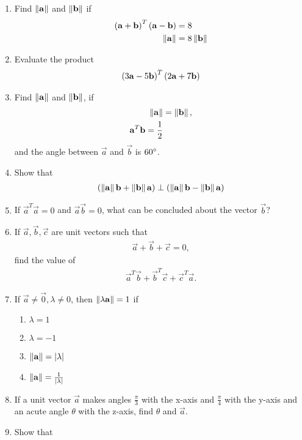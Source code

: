 \documentclass[journal,12pt,twocolumn]{IEEEtran}
\renewcommand\thesection{\arabic{section}}
\begin{document}
\begin{enumerate}[label=\thesection.\arabic*.,ref=\thesection.\theenumi]
\item Find $\left\lVert\mathbf{a}\right\rVert$ and $\left\lVert\mathbf{b}\right\rVert$ if 
\begin{align}
\left(\mathbf{a}+\mathbf{b}\right)^T\left(\mathbf{a}-\mathbf{b}\right) &= 8
\\
\left\lVert\mathbf{a}\right\rVert&=8\left\lVert\mathbf{b}\right\rVert
\end{align}
\item Evaluate the product 
\begin{align}
\left(3\mathbf{a}-5\mathbf{b}\right)^T\left(2\mathbf{a}+7\mathbf{b}\right) 
\end{align}
\item Find $\left\lVert\mathbf{a}\right\rVert$ and $\left\lVert\mathbf{b}\right\rVert$, if
\begin{align}
\left\lVert\mathbf{a}\right\rVert &= \left\lVert\mathbf{b}\right\rVert,
\\
\mathbf{a}^T\mathbf{b} = \frac{1}{2} 
\end{align}
and the angle between $\vec{a}$ and $\vec{b}$ is $60\degree$.
\item Show that 
\begin{align}
\left(\left\lVert\mathbf{a}\right\rVert\mathbf{b}+\left\lVert\mathbf{b}\right\rVert\mathbf{a}\right)\perp \left(\left\lVert\mathbf{a}\right\rVert\mathbf{b}-\left\lVert\mathbf{b}\right\rVert\mathbf{a}\right)\\
\end{align}
\item If $\vec{a}^T\vec{a}=0$ and  $\vec{a}\vec{b}=0$, what can be concluded about the vector $\vec{b}$?
\item If $\vec{a},\vec{b},\vec{c}$ are unit vectors such that 
\begin{align}
\vec{a}+\vec{b}+\vec{c} = 0,
\end{align}
find the value of 
\begin{align}
\vec{a}^T\vec{b}+\vec{b}^T\vec{c}+\vec{c}^T\vec{a}.
\end{align}
\item If $\vec{a} \ne \vec{0}, \lambda \ne 0$, then $\left\lVert\lambda \mathbf{a}\right\rVert = 1$ if
\begin{enumerate}
\item $\lambda =1$
\item $\lambda = -1$
\item $\left\lVert\mathbf{a}\right\rVert=\left\vert\lambda\right\vert$
\item $\left\lVert\mathbf{a}\right\rVert=\frac{1}{\left\vert\lambda\right\vert}$
\end{enumerate}
\item If a unit vector $\vec{a}$ makes angles $\frac{\pi}{3}$ with the x-axis and $\frac{\pi}{4}$ with the y-axis and an acute angle $\theta$ with the z-axis, find $\theta$ and $\vec{a}$.
\item Show that 

\end{enumerate}
\end{document}
